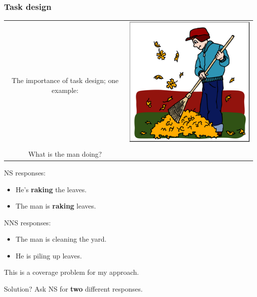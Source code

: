 \documentclass[xcolor={dvipsnames}]{beamer}
\begin{document}
\begin{frame}
\frametitle{Task design}
\vspace{-2ex}
\pause
\begin{table}
\small
\begin{center}
\begin{tabular}{c r}
& \multirow{3}{*}{\includegraphics[width=0.22\columnwidth]{figures/rake.png}} \\
     \multirow{3}{*}{The importance of task design; one example:} & \\
& \\
& \\
What is the man doing? & \\
\end{tabular}
\end{center}
\end{table}
\pause
NS responses:
\begin{itemize}
\pause
\item He's \textbf{raking} the leaves.
\pause
\item The man is \textbf{raking} leaves.
\end{itemize}
\pause
\smallskip
NNS responses:
\pause
\begin{itemize}
\item The man is cleaning the yard.
\pause
\item He is piling up leaves.
\end{itemize}
\smallskip
\pause
This is a coverage problem for my approach.
\pause

Solution? \pause Ask NS for \textbf{two} different responses.
\end{frame}
\end{document}
